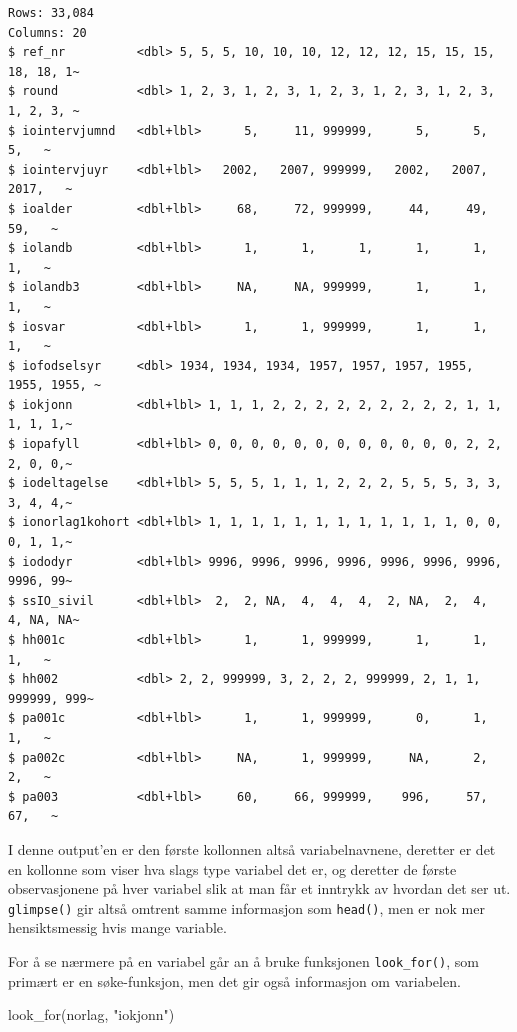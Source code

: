 \documentclass[
  letterpaper,
  DIV=11,
  numbers=noendperiod]{scrreprt}
\newenvironment{Shaded}{\begin{snugshade}}{\end{snugshade}}
\newcommand{\FunctionTok}[1]{\textcolor[rgb]{0.28,0.35,0.67}{#1}}
\newcommand{\NormalTok}[1]{\textcolor[rgb]{0.00,0.23,0.31}{#1}}
\newcommand{\StringTok}[1]{\textcolor[rgb]{0.13,0.47,0.30}{#1}}
\begin{document}
\begin{verbatim}
Rows: 33,084
Columns: 20
$ ref_nr          <dbl> 5, 5, 5, 10, 10, 10, 12, 12, 12, 15, 15, 15, 18, 18, 1~
$ round           <dbl> 1, 2, 3, 1, 2, 3, 1, 2, 3, 1, 2, 3, 1, 2, 3, 1, 2, 3, ~
$ iointervjumnd   <dbl+lbl>      5,     11, 999999,      5,      5,      5,   ~
$ iointervjuyr    <dbl+lbl>   2002,   2007, 999999,   2002,   2007,   2017,   ~
$ ioalder         <dbl+lbl>     68,     72, 999999,     44,     49,     59,   ~
$ iolandb         <dbl+lbl>      1,      1,      1,      1,      1,      1,   ~
$ iolandb3        <dbl+lbl>     NA,     NA, 999999,      1,      1,      1,   ~
$ iosvar          <dbl+lbl>      1,      1, 999999,      1,      1,      1,   ~
$ iofodselsyr     <dbl> 1934, 1934, 1934, 1957, 1957, 1957, 1955, 1955, 1955, ~
$ iokjonn         <dbl+lbl> 1, 1, 1, 2, 2, 2, 2, 2, 2, 2, 2, 2, 1, 1, 1, 1, 1,~
$ iopafyll        <dbl+lbl> 0, 0, 0, 0, 0, 0, 0, 0, 0, 0, 0, 0, 2, 2, 2, 0, 0,~
$ iodeltagelse    <dbl+lbl> 5, 5, 5, 1, 1, 1, 2, 2, 2, 5, 5, 5, 3, 3, 3, 4, 4,~
$ ionorlag1kohort <dbl+lbl> 1, 1, 1, 1, 1, 1, 1, 1, 1, 1, 1, 1, 0, 0, 0, 1, 1,~
$ iododyr         <dbl+lbl> 9996, 9996, 9996, 9996, 9996, 9996, 9996, 9996, 99~
$ ssIO_sivil      <dbl+lbl>  2,  2, NA,  4,  4,  4,  2, NA,  2,  4,  4, NA, NA~
$ hh001c          <dbl+lbl>      1,      1, 999999,      1,      1,      1,   ~
$ hh002           <dbl> 2, 2, 999999, 3, 2, 2, 2, 999999, 2, 1, 1, 999999, 999~
$ pa001c          <dbl+lbl>      1,      1, 999999,      0,      1,      1,   ~
$ pa002c          <dbl+lbl>     NA,      1, 999999,     NA,      2,      2,   ~
$ pa003           <dbl+lbl>     60,     66, 999999,    996,     57,     67,   ~
\end{verbatim}

I denne output'en er den første kollonnen altså variabelnavnene,
deretter er det en kollonne som viser hva slags type variabel det er, og
deretter de første observasjonene på hver variabel slik at man får et
inntrykk av hvordan det ser ut. \texttt{glimpse()} gir altså omtrent
samme informasjon som \texttt{head()}, men er nok mer hensiktsmessig
hvis mange variable.

For å se nærmere på en variabel går an å bruke funksjonen
\texttt{look\_for()}, som primært er en søke-funksjon, men det gir også
informasjon om variabelen.

\begin{Shaded}
\begin{Highlighting}[]
\FunctionTok{look\_for}\NormalTok{(norlag, }\StringTok{"iokjonn"}\NormalTok{)}
\end{Highlighting}
\end{Shaded}
\end{document}
